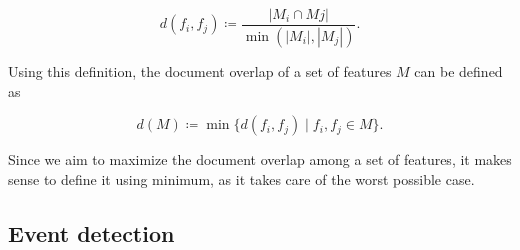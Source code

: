\begin{equation}
	d(f_{i}, f_{j}) \coloneqq \frac{\left\vert{M_{i} \cap M{j}}\right\vert}{\min({\left\vert{M_{i}}\right\vert, \left\vert{M_{j}}\right\vert})}.
\end{equation}

Using this definition, the document overlap of a set of features $M$ can be defined as

\begin{equation}
	d(M) \coloneqq \min{\big\{d(f_{i}, f_{j}) \mid f_{i}, f_{j} \in M\big\}}.
\end{equation}

Since we aim to maximize the document overlap among a set of features, it makes sense to define it using minimum, as it takes care of the worst possible case.

\subsection{Event detection}